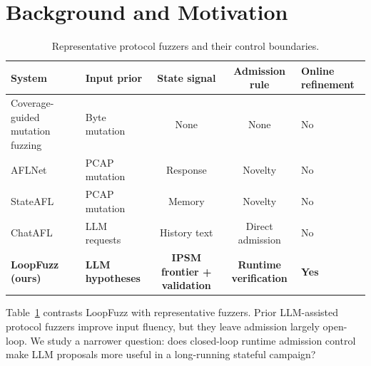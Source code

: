 \documentclass[conference]{IEEEtran}
\begin{document}
\section{Background and Motivation}

\begin{table}[ht]
\centering
\caption{Representative protocol fuzzers and their control boundaries.}
\label{tab:taxonomy}
\renewcommand{\arraystretch}{1.3}
\scriptsize
\begin{tabularx}{\textwidth}{l >{\centering\arraybackslash}X c c >{\centering\arraybackslash}X}
\toprule
\textbf{System} & \textbf{Input prior} & \textbf{State signal} & \textbf{Admission rule} & \textbf{Online refinement} \\
\midrule
Coverage-guided mutation fuzzing~\cite{directed_greybox_fuzzing_2017,seed_selection_successful_fuzzing_2021}         & Byte mutation & None & None & No \\
AFLNet~\cite{aflnet}              & PCAP mutation  & Response & Novelty & No \\
StateAFL~\cite{stateafl}          & PCAP mutation  & Memory & Novelty & No \\
ChatAFL~\cite{chatafl}            & LLM requests & History text & Direct admission & No \\
\textbf{LoopFuzz (ours)}         & \textbf{LLM hypotheses} & \textbf{IPSM frontier + validation} & \textbf{Runtime verification} & \textbf{Yes} \\
\bottomrule
\end{tabularx}
\normalsize
\end{table}

Table~\ref{tab:taxonomy} contrasts LoopFuzz with representative fuzzers. Prior LLM-assisted protocol fuzzers improve input fluency, but they leave admission largely open-loop. We study a narrower question: does closed-loop runtime admission control make LLM proposals more useful in a long-running stateful campaign?
\end{document}
